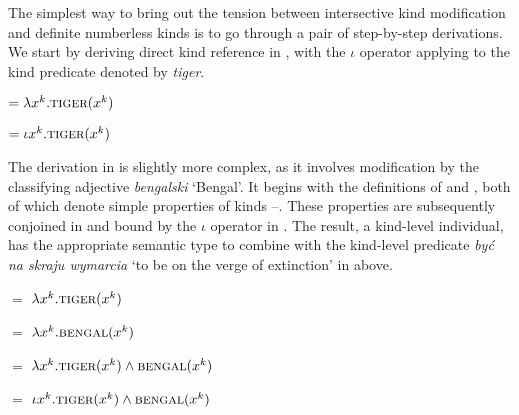\documentclass[output=paper,
colorlinks,
citecolor=brown,
newtxmath
]{langscibook}
\begin{document}
The simplest way to bring out the tension between intersective kind modification and definite numberless kinds is to go through a pair of step-by-step derivations. We start by deriving direct kind reference in , with the $\iota$ operator applying to the kind predicate denoted by \textit{tiger}.

\ea \label{ex:def_deriv}

\ea {} $= \lambda x^k.\textsc{tiger}(x^k)$
\label{ex:def_deriv_1}

\ex {} $= \iota x^k.\textsc{tiger}(x^k)$
\label{ex:def_deriv_2}
\z \z

\noindent
The derivation in  is slightly more complex, as it involves modification by the classifying adjective \textit{bengalski} `Bengal'. It begins with the definitions of  and , both of which denote simple properties of kinds --. These properties are subsequently conjoined in  and bound by the $\iota$ operator in . The result, a kind-level individual, has the appropriate semantic type to combine with the kind-level predicate \textit{być na skraju wymarcia} `to be on the verge of extinction' in  above.

\ea \label{ex:inter_deriv}

\ea {} $=$  $\lambda x^k.\textsc{tiger}(x^k)$
\label{ex:inter_deriv_1}

\ex {} $=$  $\lambda x^k.\textsc{bengal}(x^k)$
\label{ex:inter_deriv_2}

\ex {} $=$ $\lambda x^k.\textsc{tiger}(x^k) \wedge \textsc{bengal}(x^k)$
\label{ex:inter_deriv_3}

\ex {} $=$ $\iota x^k.\textsc{tiger}(x^k) \wedge \textsc{bengal}(x^k)$
\label{ex:inter_deriv_4}
\z \z
\end{document}
